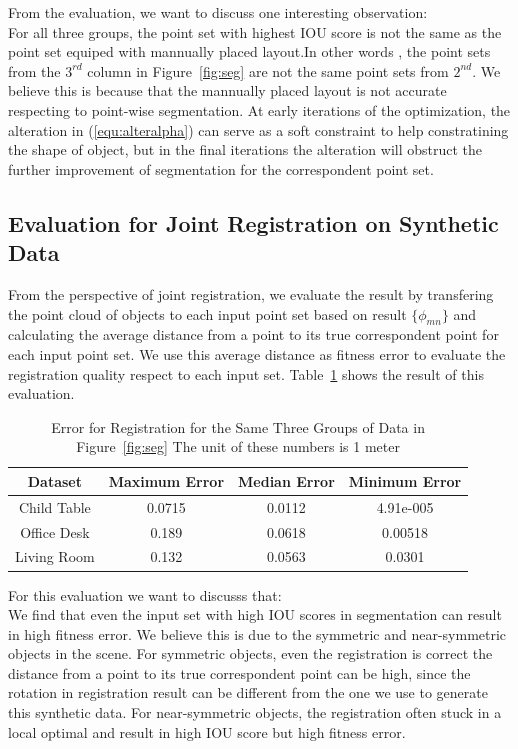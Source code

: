 From the evaluation, we want to discuss one interesting observation:\\
For all three groups, the point set with highest IOU score is not the same as the point set equiped with mannually placed layout.In other words , the point sets from the $3^{rd}$ column in Figure~\ref{fig:seg} are not the same point sets from $2^{nd}$. We believe this is because that the mannually placed layout is not accurate respecting to point-wise segmentation. At early iterations of the optimization, the alteration in (\ref{equ:alteralpha}) can serve as a soft constraint to help constratining the shape of object, but in the final iterations the alteration will obstruct the further improvement of segmentation for the correspondent point set. 
\subsection{Evaluation for Joint Registration on Synthetic Data}
From the perspective of joint registration, we evaluate the result by transfering the point cloud of objects  to each input point set based on result $\{\phi_{mn}\}$ and calculating the average distance from a point to its true correspondent point for each input point set.  We use this average distance as fitness error to evaluate the registration quality respect to each input set.
Table~\ref{tab:regerror} shows the result of this evaluation.
\begin{table}
\centering
\begin{tabular}{c c c c}
Dataset & Maximum Error & Median Error & Minimum Error \\
\hline
Child Table & 0.0715 & 0.0112 & 4.91e-005 \\   
Office Desk & 0.189  & 0.0618 & 0.00518 \\
Living Room & 0.132  & 0.0563 & 0.0301\\
\end{tabular}
\caption{Error for Registration for the Same Three Groups of Data in Figure~\ref{fig:seg} The unit of these numbers is 1 meter}
\label{tab:regerror}
\end{table}
For this evaluation we want to discusss that:\\
We find that even the input set with high IOU scores in segmentation can result in high fitness error. We believe this is due to the symmetric and near-symmetric objects in the scene. For symmetric objects, even the registration is correct the distance from a point to its true correspondent point can be high, since the rotation in registration result can be different from the one we use to generate this synthetic data. For near-symmetric objects, the registration often stuck in a local optimal and result in high IOU score but high fitness error.

